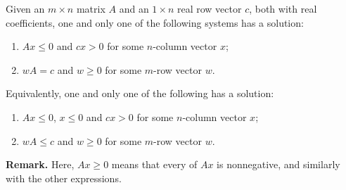 \documentclass[12pt]{article}
\begin{document}
Given an $m\times n$ matrix $A$ and an $1\times n$ real row vector $c$, both with real coefficients, one and only one of the following systems has a solution:
\begin{enumerate}
\item $Ax\leq 0$ and $cx > 0$ for some $n$-column vector $x$;
\item $wA = c$ and $w\geq 0$ for some $m$-row vector $w$.
\end{enumerate}
Equivalently, one and only one of the following has a solution:
\begin{enumerate}
\item $Ax\leq 0$, $x\leq 0$ and $cx>0$ for some $n$-column vector $x$;
\item $wA\leq c$ and $w\geq 0$ for some $m$-row vector $w$.
\end{enumerate}

\textbf{Remark.} Here, $Ax\geq 0$ means that every  of $Ax$ is nonnegative, and similarly with the other expressions.
\end{document}
